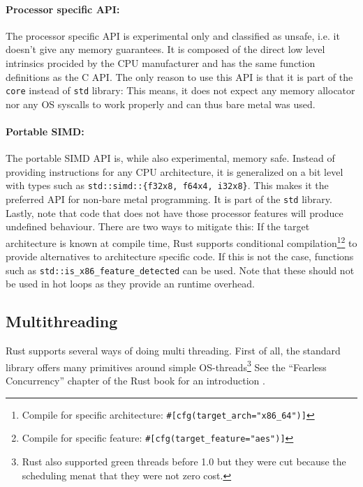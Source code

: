 \paragraph{Processor specific API:} The processor specific API is experimental only and classified as unsafe, i.e. it doesn't give any memory guarantees. It is composed of the direct low level intrinsics procided by the CPU manufacturer and has the same function definitions as the C API. The only reason to use this API is that it is part of the \texttt{core} instead of \texttt{std} library: This means, it does not expect any memory allocator nor any OS syscalls to work properly and can thus bare metal was used.

\paragraph{Portable SIMD:} The portable \ac{SIMD} API is, while also experimental, memory safe. Instead of providing instructions for any CPU architecture, it is generalized on a bit level with types such as \texttt{std::simd::\{f32x8, f64x4, i32x8\}}. This makes it the preferred API for non-bare metal programming. It is part of the \texttt{std} library.\\

Lastly, note that code that does not have those processor features will produce undefined behaviour. There are two ways to mitigate this: If the target architecture is known at compile time, Rust supports conditional compilation\footnote{Compile for specific architecture: \texttt{\#[cfg(target\_arch="x86\_64")]}}\footnote{Compile for specific feature: \texttt{\#[cfg(target\_feature="aes")]}} to provide alternatives to architecture specific code. If this is not the case, functions such as \texttt{std::is\_x86\_feature\_detected} can be used. Note that these should not be used in hot loops as they provide an runtime overhead.

\subsection{Multithreading}

Rust supports several ways of doing multi threading. First of all, the standard library offers many primitives around simple OS-threads\footnote{Rust also supported green threads before 1.0 but they were cut because the scheduling menat that they were not zero cost.} See the ``Fearless Concurrency'' chapter of the Rust book for an introduction \cite{conbook}.\\


